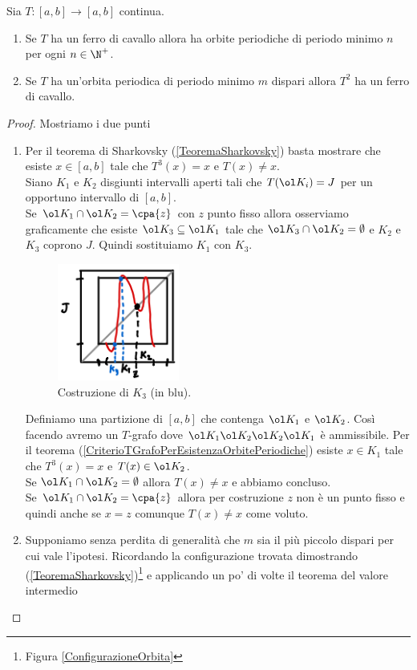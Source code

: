 \begin{proposition}\label{RelazioneFerroDiCavalloEPeriodiMinimi}
Sia $T:[a,b]\to[a,b]$ continua.
\begin{enumerate}
\item Se $T$ ha un ferro di cavallo allora ha orbite periodiche di periodo minimo $n$ per ogni $n\in\N^+$.
\item Se $T$ ha un'orbita periodica di periodo minimo $m$ dispari allora $T^2$ ha un ferro di cavallo. 
\end{enumerate}
\end{proposition}
\begin{proof}
Mostriamo i due punti
\setlength{\leftmargini}{0cm}
\begin{enumerate}
\item Per il teorema di Sharkovsky (\ref{TeoremaSharkovsky}) basta mostrare che esiste $x\in [a,b]$ tale che $T^3(x)=x$ e $T(x)\neq x$.\\ 
Siano $K_1$ e $K_2$ disgiunti intervalli aperti tali che $T(\ol K_i)=J$ per un opportuno intervallo di $[a,b]$.\\
Se $\ol K_1\cap \ol K_2=\cpa{z}$ con $z$ punto fisso allora osserviamo graficamente che esiste $\ol K_3\subseteq \ol K_1$ tale che $\ol K_3\cap \ol K_2=\emptyset$ e $K_2$ e $K_3$ coprono $J$. Quindi sostituiamo $K_1$ con $K_3$.

\begin{figure}[!htb]
	\centering
	\includegraphics[width=4cm]{Immagini/esempio_Dimostrazione_ferro_di_cavallo.png}
	\caption{Costruzione di $K_3$ (in blu).}
\end{figure}


Definiamo una partizione di $[a,b]$ che contenga $\ol K_1$ e $\ol K_2$. Cos\`i facendo avremo un $T$-grafo dove $\ol K_1\ol K_2\ol K_2\ol K_1$ \`e ammissibile. Per il teorema (\ref{CriterioTGrafoPerEsistenzaOrbitePeriodiche}) esiste $x\in K_1$ tale che $T^3(x)=x$ e $T(x)\in \ol K_2$.\\
Se $\ol K_1\cap \ol K_2=\emptyset$ allora $T(x)\neq x$ e abbiamo concluso.\\
Se $\ol K_1\cap \ol K_2=\cpa{z}$ allora per costruzione $z$ non \`e un punto fisso e quindi anche se $x=z$ comunque $T(x)\neq x$ come voluto.
\item Supponiamo senza perdita di generalit\`a che $m$ sia il pi\`u piccolo dispari per cui vale l'ipotesi. Ricordando la configurazione trovata dimostrando (\ref{TeoremaSharkovsky})\footnote{Figura \ref{ConfigurazioneOrbita}} e applicando un po' di volte il teorema del valore intermedio


\end{enumerate}
\end{proof}
